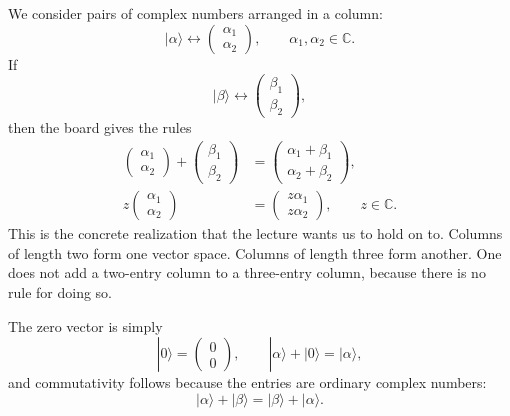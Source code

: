 We consider pairs of complex numbers arranged in a column:
\begin{equation}
|\alpha\rangle
\leftrightarrow
\begin{pmatrix}
\alpha_1\\
\alpha_2
\end{pmatrix},
\qquad
\alpha_1,\alpha_2\in\mathbb{C}.
\end{equation}
If
\[
|\beta\rangle
\leftrightarrow
\begin{pmatrix}
\beta_1\\
\beta_2
\end{pmatrix},
\]
then the board gives the rules
\begin{align}
\begin{pmatrix}
\alpha_1\\
\alpha_2
\end{pmatrix}
+
\begin{pmatrix}
\beta_1\\
\beta_2
\end{pmatrix}
&=
\begin{pmatrix}
\alpha_1+\beta_1\\
\alpha_2+\beta_2
\end{pmatrix},\\
z
\begin{pmatrix}
\alpha_1\\
\alpha_2
\end{pmatrix}
&=
\begin{pmatrix}
z\alpha_1\\
z\alpha_2
\end{pmatrix},
\qquad
z\in\mathbb{C}.
\end{align}
This is the concrete realization that the lecture wants us to hold on to. Columns of length two form one vector space. Columns of length three form another. One does not add a two-entry column to a three-entry column, because there is no rule for doing so.

The zero vector is simply
\begin{equation}
|0\rangle=
\begin{pmatrix}
0\\
0
\end{pmatrix},
\qquad
|\alpha\rangle+|0\rangle=|\alpha\rangle,
\end{equation}
and commutativity follows because the entries are ordinary complex numbers:
\begin{equation}
|\alpha\rangle+|\beta\rangle=|\beta\rangle+|\alpha\rangle.
\end{equation}

